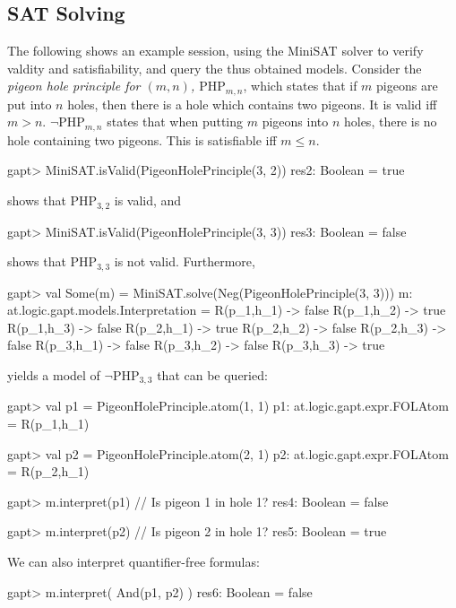 \documentclass[a4paper,11pt]{article}
\begin{document}
\subsection{SAT Solving}
%
The following shows an example session, using the MiniSAT solver
to verify valdity and satisfiability, and query the thus obtained models.
Consider the {\em pigeon hole principle for $(m, n)$, $\mathrm{PHP}_{m,n}$}, which states that if $m$ pigeons
are put into $n$ holes, then there is a hole which contains two pigeons. It is valid
iff $m>n$. $\neg\mathrm{PHP}_{m,n}$ states that when putting $m$ pigeons into $n$ holes, there
is no hole containing two pigeons. This is satisfiable iff $m\leq n$.
\begin{clilisting}
gapt> MiniSAT.isValid(PigeonHolePrinciple(3, 2))
res2: Boolean = true

\end{clilisting}
shows that $\mathrm{PHP}_{3,2}$ is valid, and
\begin{clilisting}
gapt> MiniSAT.isValid(PigeonHolePrinciple(3, 3))
res3: Boolean = false

\end{clilisting}
shows that $\mathrm{PHP}_{3,3}$ is not valid.
Furthermore,
\begin{clilisting}
gapt> val Some(m) = MiniSAT.solve(Neg(PigeonHolePrinciple(3, 3)))
m: at.logic.gapt.models.Interpretation =
R(p_1,h_1) -> false
R(p_1,h_2) -> true
R(p_1,h_3) -> false
R(p_2,h_1) -> true
R(p_2,h_2) -> false
R(p_2,h_3) -> false
R(p_3,h_1) -> false
R(p_3,h_2) -> false
R(p_3,h_3) -> true

\end{clilisting}
yields a model of $\neg\mathrm{PHP}_{3,3}$ that can be queried:
\begin{clilisting}
gapt> val p1 = PigeonHolePrinciple.atom(1, 1)
p1: at.logic.gapt.expr.FOLAtom = R(p_1,h_1)

gapt> val p2 = PigeonHolePrinciple.atom(2, 1)
p2: at.logic.gapt.expr.FOLAtom = R(p_2,h_1)

gapt> m.interpret(p1) // Is pigeon 1 in hole 1?
res4: Boolean = false

gapt> m.interpret(p2) // Is pigeon 2 in hole 1?
res5: Boolean = true

\end{clilisting}
We can also interpret quantifier-free formulas:
\begin{clilisting}
gapt> m.interpret( And(p1, p2) )
res6: Boolean = false

\end{clilisting}
\end{document}
